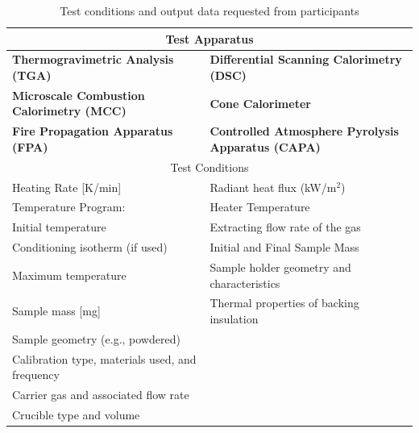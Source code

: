 \documentclass{book}
\begin{document}
\begin{table}[ht]
\caption{Test conditions and output data requested from participants}
\label{Table_2}
\begin{center}
\begin{tabular}{ll}
\multicolumn{2}{c}{Test Apparatus}                                                                       \\ \hline
 \textbf{Thermogravimetric Analysis (TGA)}         &  \textbf{Differential Scanning Calorimetry (DSC)}              \\
 \textbf{Microscale Combustion Calorimetry (MCC)} &  \textbf{Cone Calorimeter}                                     \\
 \textbf{Fire Propagation Apparatus (FPA)}                  &  \textbf{Controlled Atmosphere Pyrolysis Apparatus (CAPA)}     \\
\multicolumn{2}{c}{Test Conditions}                                                                      \\ \hline
Heating Rate [K/min]                              & Radiant heat flux (kW/m$^2$)                         \\
Temperature Program:                              & Heater Temperature                                   \\
\hspace{.1in} Initial temperature                 & Extracting flow rate of the gas                      \\
\hspace{.1in} Conditioning isotherm (if used)     & Initial and Final Sample Mass                        \\
\hspace{.1in} Maximum temperature                 & Sample holder geometry and characteristics           \\
Sample mass [mg]                                  & Thermal properties of backing insulation             \\
Sample geometry (e.g., powdered)                  &                                                      \\
Calibration type, materials used, and frequency   &                                                      \\
Carrier gas and associated flow rate              &                                                      \\
Crucible type and volume                          &                                                      \\

\end{tabular}
\end{center}
\end{table}
\end{document}
